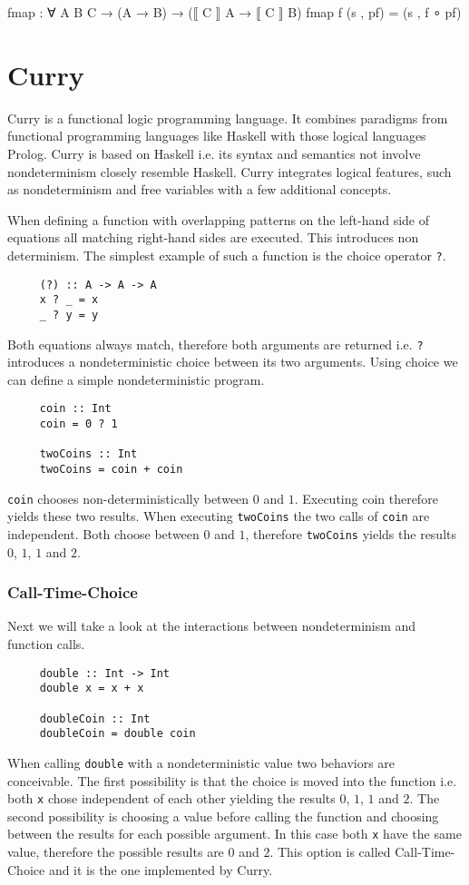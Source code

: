 \documentclass[10pt,a4paper,twoside]{report}
\begin{document}
\begin{code}
fmap : ∀ {A B C} → (A → B) → (⟦ C ⟧ A → ⟦ C ⟧ B)
fmap f (s , pf) = (s , f ∘ pf)
\end{code}

\section{Curry}

Curry \cite{Hanus95curry} is a functional logic programming language.
It combines paradigms from functional programming languages like Haskell
with those logical languages Prolog.
Curry is based on Haskell i.e. its syntax and semantics not involve
nondeterminism closely resemble Haskell.
Curry integrates logical features, such as nondeterminism and free variables
with a few additional concepts.

When defining a function with overlapping patterns on the left-hand side of
equations all matching right-hand sides are executed.
This introduces non determinism.
The simplest example of such a function is the choice operator \texttt{?}.

\begin{verbatim}
     (?) :: A -> A -> A
     x ? _ = x
     _ ? y = y
\end{verbatim}
Both equations always match, therefore both arguments are returned i.e.
\texttt{?} introduces a nondeterministic choice between its two arguments.
Using choice we can define a simple nondeterministic program.

\begin{verbatim}
     coin :: Int
     coin = 0 ? 1

     twoCoins :: Int
     twoCoins = coin + coin
\end{verbatim}
\texttt{coin} chooses non-deterministically between $0$ and $1$.
Executing coin therefore yields these two results.
When executing \texttt{twoCoins} the two calls of \texttt{coin} are independent.
Both choose between $0$ and $1$, therefore \texttt{twoCoins} yields the results
$0$, $1$, $1$ and $2$.

\subsubsection{Call-Time-Choice}
\label{call-time-choice}
Next we will take a look at the interactions between nondeterminism and function
calls.

\begin{verbatim}
     double :: Int -> Int
     double x = x + x
     
     doubleCoin :: Int
     doubleCoin = double coin
\end{verbatim}
When calling \texttt{double} with a nondeterministic value two behaviors are
conceivable.
The first possibility is that the choice is moved into the function i.e. both
\texttt{x} chose independent of each other yielding the results $0$, $1$, $1$
and $2$.
The second possibility is choosing a value before calling the function and
choosing between the results for each possible argument.
In this case both \texttt{x} have the same value, therefore the possible results
are $0$ and $2$.
This option is called Call-Time-Choice and it is the one implemented by Curry.
\end{document}
